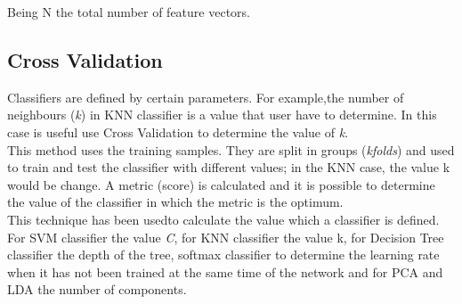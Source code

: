 Being N the total number of feature vectors.\\

\subsection{Cross Validation}
Classifiers are defined by certain parameters. For example,the number of neighbours (\textit{k}) in KNN classifier is a value that user have to determine. In this case is useful use Cross Validation to determine the value of \textit{k}.\\

This method uses the training samples. They are split in groups (\textit{kfolds}) and used to train and test the classifier with different values; in the KNN case, the value k would be change. A metric (score) is calculated and it is possible to determine the value of the classifier in which the metric is the optimum.\\

This technique has been usedto calculate the value which a classifier is defined. For SVM classifier the value \textit{C}, for KNN classifier the value {k}, for Decision Tree classifier the depth of the tree, softmax classifier to determine the learning rate when it has not been trained at the same time of the network and for PCA and LDA the number of components. \\
